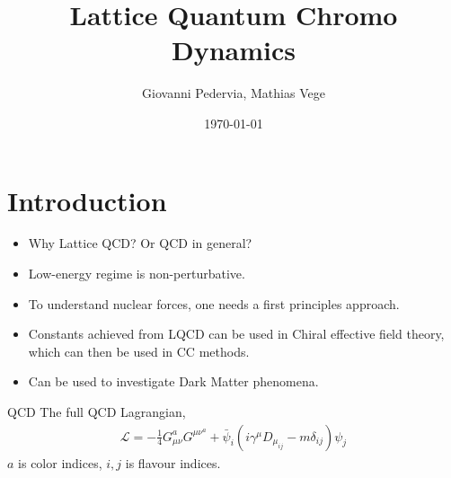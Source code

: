 \documentclass[10pt]{beamer}
\title{Lattice Quantum Chromo Dynamics}
\date{\today}
\author{Giovanni Pedervia, Mathias Vege}
\institute{University of Oslo}
\begin{document}
\maketitle


\section{Introduction}
\begin{frame}
	\begin{itemize}%
		\item Why Lattice QCD? Or QCD in general?
		\item Low-energy regime is non-perturbative.
		\item To understand nuclear forces, one needs a first principles approach.
		\item Constants achieved from LQCD can be used in Chiral effective field theory, which can then be used in CC methods.
		\item Can be used to investigate Dark Matter phenomena.
	\end{itemize}
\end{frame}


\begin{frame}{QCD}
	The full QCD Lagrangian,
	\begin{align}
		\mathcal{L} = -\frac{1}{4} G_{\mu\nu}^a G^{\mu\nu}^a + \bar{\psi}_i (i\gamma^{\mu} D_{\mu}_{ij} - m\delta_{ij})\psi_j
	\end{align}
	$a$ is color indices, $i,j$ is flavour indices.
\end{frame}
\end{document}
